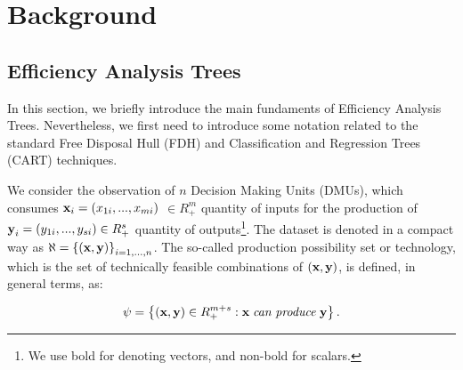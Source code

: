 \hypertarget{section2}{%
\section{Background}\label{section2}}

\hypertarget{section2.1}{%
\subsection{Efficiency Analysis Trees}\label{section2.1}}

In this section, we briefly introduce the main fundaments of Efficiency Analysis Trees. Nevertheless, we first need to introduce some notation related to the standard Free Disposal Hull (FDH) and Classification and Regression Trees (CART) techniques.

We consider the observation of \(n\) Decision Making Units (DMUs), which consumes \({\it \textbf{x}}_{i} =(x_{1i} ,...,x_{mi})\) \(\in R_{+}^{m}\) quantity of inputs for the production of \({\it \textbf{y}}_{i} =(y_{1i} ,...,y_{si} )\in R_{+}^{s}\) quantity of outputs\footnote{We use bold for denoting vectors, and non-bold for scalars.}. The dataset is denoted in a compact way as \(\aleph =\left\{\left({\it \textbf{x},\textbf{y}}\right)\right\}_{i=1,...,n}^{}\). The so-called production possibility set or technology, which is the set of technically feasible combinations of \(({\it \textbf{x},\textbf{y}})\), is defined, in general terms, as:

\begin{equation} \label{(1)} 
\psi =\left\{({\it \textbf{x},\textbf{y}})\in R_{+}^{m+s} :{\it \textbf{x}\; }{\it can\; produce\; \textbf{y}}\right\}.
\end{equation}

